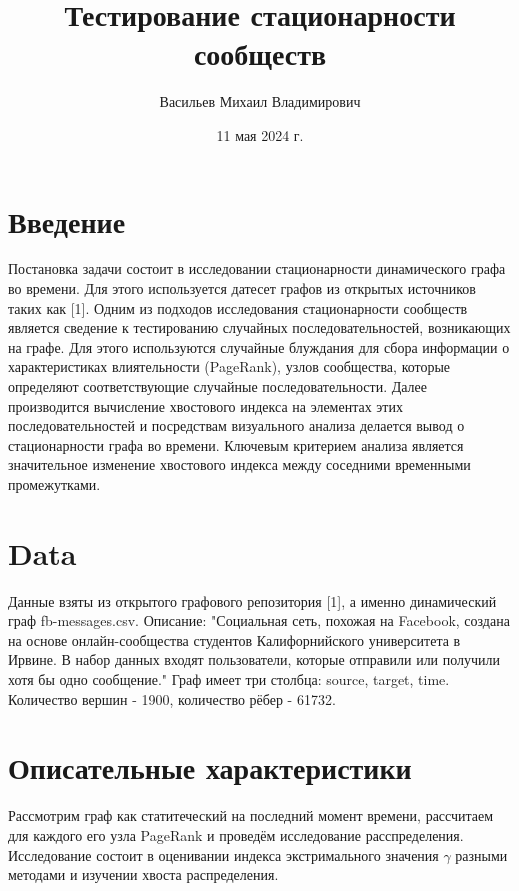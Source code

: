 \documentclass[reprint, amsmath, amssymb, aps,]{revtex4-2}
\begin{document}
\title{Тестирование стационарности сообществ}



\author{Васильев Михаил Владимирович}
%


\date{11 мая 2024 г.}%
             



\maketitle

\section{Введение}
Постановка задачи состоит в исследовании стационарности динамического графа во времени. Для этого используется датесет графов из открытых источников таких как [1]. Одним из подходов исследования стационарности сообществ является сведение к тестированию случайных последовательностей, возникающих на графе. Для этого используются случайные блуждания для сбора информации о характеристиках влиятельности (PageRank), узлов сообщества, которые определяют соответствующие случайные последовательности. Далее производится вычисление хвостового индекса на элементах этих последовательностей и посредствам визуального анализа делается вывод о стационарности графа во времени. Ключевым критерием анализа является значительное изменение хвостового индекса между соседними временными промежутками.



\section{Data}
Данные взяты из открытого графового репозитория [1], а именно динамический граф fb-messages.csv. Описание: "Социальная сеть, похожая на Facebook, создана на основе онлайн-сообщества студентов Калифорнийского университета в Ирвине. В набор данных входят пользователи, которые отправили или получили хотя бы одно сообщение." Граф имеет три столбца: source, target, time. Количество вершин - 1900, количество рёбер - 61732.


\section{Описательные характеристики}
Рассмотрим граф как статитеческий на последний момент времени, рассчитаем для каждого его узла PageRank и проведём исследование расспределения. Исследование состоит в оценивании индекса экстримального значения $\gamma$ разными методами и изучении хвоста распределения.
\end{document}
